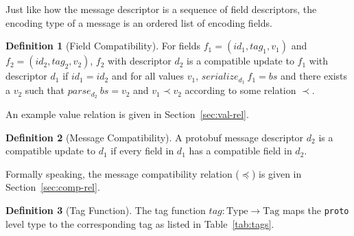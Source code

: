 \documentclass[11pt]{article}
\theoremstyle{definition}
\newtheorem{definition}{Definition}[section]
\theoremstyle{plain}
\begin{document}
Just like how the message descriptor is a sequence of field descriptors, the
encoding type of a message is an ordered list of encoding fields.
\\
\begin{definition}[Field Compatibility]
	For fields $f_1 = (id_1, tag_1, v_1)$ and $f_2 = (id_2, tag_2, v_2)$, $f_2$
	with descriptor $d_2$ is a compatible update to $f_1$ with descriptor $d_1$ if
	$id_1 = id_2$ and for all values $v_1$, $serialize_{d_1}\ f_1 = bs$ and there
	exists a $v_2$ such that $parse_{d_2}\ bs = v_2$ and $v_1 \prec v_2$ according to
	some relation $\prec$.
\end{definition}

An example value relation is given in Section~\ref{sec:val-rel}.
\\
\begin{definition}[Message Compatibility]
	A protobuf message descriptor $d_2$ is a compatible update to $d_1$ if every
	field in $d_1$ has a compatible field in $d_2$.
\end{definition}

Formally speaking, the message compatibility relation ($\preceq$) is given in
Section~\ref{sec:comp-rel}.
\\
\begin{definition}[Tag Function]
  The tag function $tag : \text{Type} \rightarrow \text{Tag}$ maps the \texttt{proto}
  level type to the corresponding tag as listed in Table~\ref{tab:tags}.
\end{definition}
\end{document}
